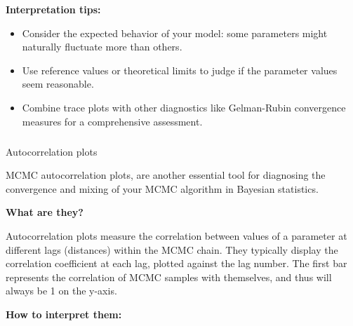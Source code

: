 \documentclass[
  8pt,
  a4paper]{article}
\makeatletter
\let\oldsubparagraph\subparagraph
\renewcommand{\subparagraph}{
    \@ifstar
      \xxxSubParagraphStar
      \xxxSubParagraphNoStar
  }
\newcommand{\xxxSubParagraphStar}[1]{\oldsubparagraph*{#1}\mbox{}}
\newcommand{\xxxSubParagraphNoStar}[1]{\oldsubparagraph{#1}\mbox{}}
\providecommand{\tightlist}{%
  \setlength{\itemsep}{0pt}\setlength{\parskip}{0pt}}\usepackage{longtable,booktabs,array}
\makeatother
\begin{document}
\textbf{Interpretation tips:}

\begin{itemize}
\tightlist
\item
  Consider the expected behavior of your model: some parameters might
  naturally fluctuate more than others.
\item
  Use reference values or theoretical limits to judge if the parameter
  values seem reasonable.
\item
  Combine trace plots with other diagnostics like Gelman-Rubin
  convergence measures for a comprehensive assessment.
\end{itemize}

\subparagraph{Autocorrelation plots}\label{autocorrelation-plots}

MCMC autocorrelation plots, are another essential tool for diagnosing
the convergence and mixing of your MCMC algorithm in Bayesian
statistics.

\textbf{What are they?}

Autocorrelation plots measure the correlation between values of a
parameter at different lags (distances) within the MCMC chain. They
typically display the correlation coefficient at each lag, plotted
against the lag number. The first bar represents the correlation of MCMC
samples with themselves, and thus will always be 1 on the y-axis.

\textbf{How to interpret them:}
\end{document}
